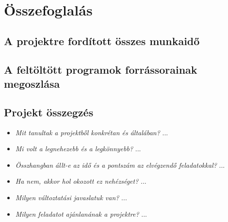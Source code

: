 \chapter{Összefoglalás}
\section{A projektre fordított összes munkaidő}
\begin{ertekelesOra}
\end{ertekelesOra}

\section{A feltöltött programok forrássorainak megoszlása}
\begin{ertekelesKod}
\end{ertekelesKod}

\section{Projekt összegzés}
\begin{itemize}
\item \textit{Mit tanultak a projektből konkrétan és általában?} \newline
    ...
\item \textit{Mi volt a legnehezebb és a legkönnyebb?} \newline
    ...
\item \textit{Összhangban állt-e az idő és a pontszám az elvégzendő feladatokkal?} \newline
    ...
\item \textit{Ha nem, akkor hol okozott ez nehézséget?} \newline
    ...
\item \textit{Milyen változtatási javaslatuk van?} \newline
    ...
\item \textit{Milyen feladatot ajánlanának a projektre?} \newline
    ...
\end{itemize}



